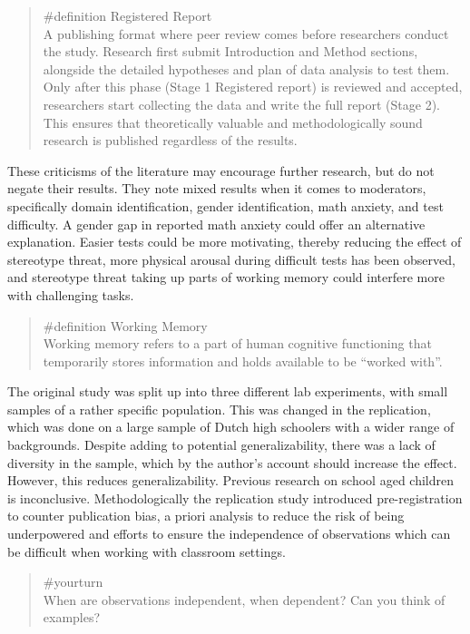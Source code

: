 \documentclass[
  letterpaper,
]{book}
\begin{document}
\begin{quote}
\label{def-registeredreport}{\#definition} Registered
Report\\
A publishing format where peer review comes before researchers conduct
the study. Research first submit Introduction and Method sections,
alongside the detailed hypotheses and plan of data analysis to test
them. Only after this phase (Stage 1 Registered report) is reviewed and
accepted, researchers start collecting the data and write the full
report (Stage 2). This ensures that theoretically valuable and
methodologically sound research is published regardless of the results.
\end{quote}

These criticisms of the literature may encourage further research, but
do not negate their results. They note mixed results when it comes to
moderators, specifically domain identification, gender identification,
math anxiety, and test difficulty. A gender gap in reported math anxiety
could offer an alternative explanation. Easier tests could be more
motivating, thereby reducing the effect of stereotype threat, more
physical arousal during difficult tests has been observed, and
stereotype threat taking up parts of working memory could interfere more
with challenging tasks.

\begin{quote}
\label{def-workingmemory}{\#definition} Working Memory\\
Working memory refers to a part of human cognitive functioning that
temporarily stores information and holds available to be ``worked
with''.
\end{quote}

The original study was split up into three different lab experiments,
with small samples of a rather specific population. This was changed in
the replication, which was done on a large sample of Dutch high
schoolers with a wider range of backgrounds. Despite adding to potential
generalizability, there was a lack of diversity in the sample, which by
the author's account should increase the effect. However, this reduces
generalizability. Previous research on school aged children is
inconclusive. Methodologically the replication study introduced
pre-registration to counter publication bias, a priori analysis to
reduce the risk of being underpowered and efforts to ensure the
independence of observations which can be difficult when working with
classroom settings.

\begin{quote}
{\#yourturn}\\
When are observations independent, when dependent? Can you think of
examples?
\end{quote}
\end{document}
